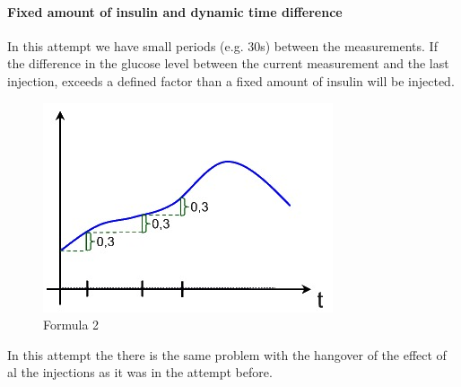 \paragraph{Fixed amount of insulin and dynamic time difference}
In this attempt we have small periods (e.g. 30s) between the measurements. If the difference in the glucose level between the current measurement and the last injection, exceeds a defined factor than a fixed amount of insulin will be injected.
\begin{figure}[htb]
\centering
\includegraphics[width=\textwidth]{images/graf2.jpg}
\caption{Formula 2}
\label{fig:formula_2}
\end{figure}
In this attempt the there is the same problem with the hangover of the effect of al the injections as it was in the attempt before.

